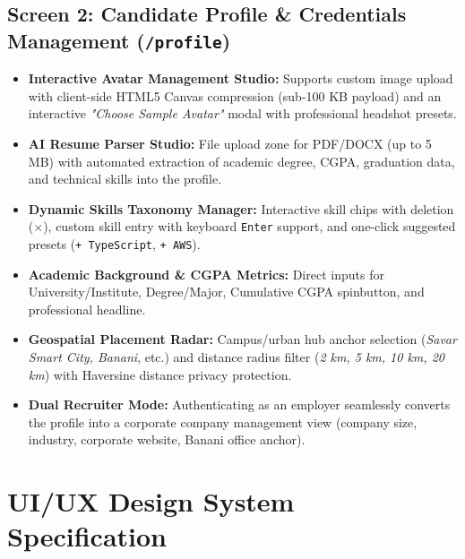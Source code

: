 \documentclass[11pt,a4paper]{article}
\begin{document}
\subsection{Screen 2: Candidate Profile \& Credentials Management (\texttt{/profile})}
\begin{itemize}[leftmargin=1.5em, itemsep=0.3em]
    \item \textbf{Interactive Avatar Management Studio:} Supports custom image upload with client-side HTML5 Canvas compression (sub-100 KB payload) and an interactive \textit{"Choose Sample Avatar"} modal with professional headshot presets.
    \item \textbf{AI Resume Parser Studio:} File upload zone for PDF/DOCX (up to 5 MB) with automated extraction of academic degree, CGPA, graduation data, and technical skills into the profile.
    \item \textbf{Dynamic Skills Taxonomy Manager:} Interactive skill chips with deletion ($\times$), custom skill entry with keyboard \texttt{Enter} support, and one-click suggested presets (\texttt{+ TypeScript}, \texttt{+ AWS}).
    \item \textbf{Academic Background \& CGPA Metrics:} Direct inputs for University/Institute, Degree/Major, Cumulative CGPA spinbutton, and professional headline.
    \item \textbf{Geospatial Placement Radar:} Campus/urban hub anchor selection (\textit{Savar Smart City, Banani}, etc.) and distance radius filter (\textit{2 km, 5 km, 10 km, 20 km}) with Haversine distance privacy protection.
    \item \textbf{Dual Recruiter Mode:} Authenticating as an employer seamlessly converts the profile into a corporate company management view (company size, industry, corporate website, Banani office anchor).
\end{itemize}

\vspace{1.5em}

\section{UI/UX Design System Specification}
\end{document}
